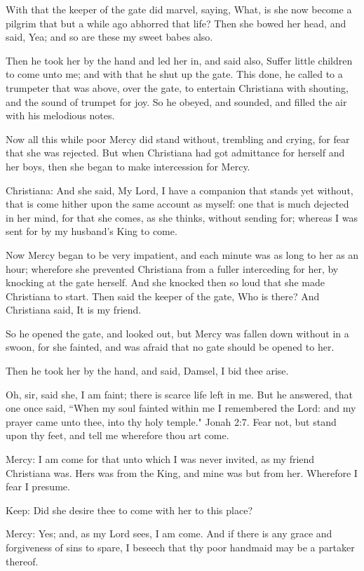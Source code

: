 With that the keeper of the gate did marvel, saying, What, is she now become a pilgrim that but a while ago abhorred that life? Then she bowed her head, and said, Yea; and so are these my sweet babes also.

Then he took her by the hand and led her in, and said also, Suffer little children to come unto me; and with that he shut up the gate. This done, he called to a trumpeter that was above, over the gate, to entertain Christiana with shouting, and the sound of trumpet for joy. So he obeyed, and sounded, and filled the air with his melodious notes.

Now all this while poor Mercy did stand without, trembling and crying, for fear that she was rejected. But when Christiana had got admittance for herself and her boys, then she began to make intercession for Mercy.

Christiana: And she said, My Lord, I have a companion that stands yet without, that is come hither upon the same account as myself: one that is much dejected in her mind, for that she comes, as she thinks, without sending for; whereas I was sent for by my husband's King to come.

Now Mercy began to be very impatient, and each minute was as long to her as an hour; wherefore she prevented Christiana from a fuller interceding for her, by knocking at the gate herself. And she knocked then so loud that she made Christiana to start. Then said the keeper of the gate, Who is there? And Christiana said, It is my friend.

So he opened the gate, and looked out, but Mercy was fallen down without in a swoon, for she fainted, and was afraid that no gate should be opened to her.

Then he took her by the hand, and said, Damsel, I bid thee arise.

Oh, sir, said she, I am faint; there is scarce life left in me. But he answered, that one once said, ``When my soul fainted within me I remembered the Lord: and my prayer came unto thee, into thy holy temple." Jonah 2:7. Fear not, but stand upon thy feet, and tell me wherefore thou art come.

Mercy: I am come for that unto which I was never invited, as my friend Christiana was. Hers was from the King, and mine was but from her. Wherefore I fear I presume.

Keep: Did she desire thee to come with her to this place?

Mercy: Yes; and, as my Lord sees, I am come. And if there is any grace and forgiveness of sins to spare, I beseech that thy poor handmaid may be a partaker thereof.

